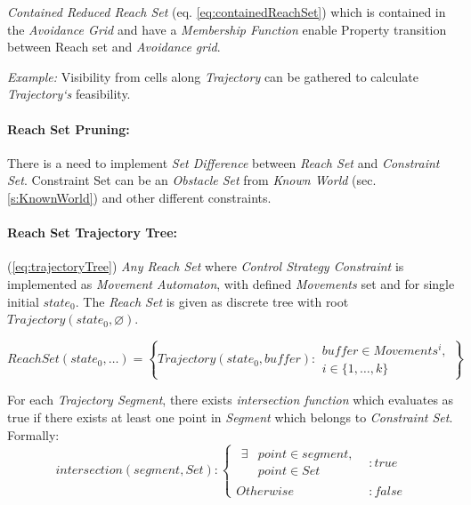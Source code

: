     \begin{note}
        \emph{Contained Reduced Reach Set} (eq. \ref{eq:containedReachSet}) which is contained in the \emph{Avoidance Grid} and have a \emph{Membership Function} enable Property transition between Reach set and \emph{Avoidance grid}. 
        
        \emph{Example:} Visibility from cells along \emph{Trajectory} can be gathered to calculate \emph{Trajectory`s} feasibility.
    \end{note}
    
    \paragraph{Reach Set Pruning:} There is a need to implement \emph{Set Difference} between \emph{Reach Set} and 
    \emph{Constraint Set}. Constraint Set can be an \emph{Obstacle Set} from \emph{Known World} (sec. \ref{s:KnownWorld}) and other different constraints.
    
    \paragraph{Reach Set Trajectory Tree:} (\ref{eq:trajectoryTree}) \emph{Any Reach Set} where \emph{Control Strategy Constraint} is implemented as \emph{Movement Automaton}, with defined \emph{Movements} set and for single initial $state_0$. The \emph{Reach Set} is given as discrete tree with root $Trajectory(state_0,\varnothing)$. 
    
    \begin{equation}\label{eq:trajectoryTree}
        ReachSet(state_0,\dots) = \left\{Trajectory(state_0,buffer):
        \begin{gathered}
            buffer\in Movements^i,\\
            i\in\{1,\dots,k\}
        \end{gathered}\right\}
    \end{equation}
    
    \noindent For each \emph{Trajectory Segment}, there exists \emph{intersection function} which evaluates as true if there exists at least one point in \emph{Segment} which belongs to \emph{Constraint Set}. Formally: 
    \begin{equation}\label{eq:reachsetIntersectionConstraintSet}
        intersection(segment,Set):
        \begin{cases}
            \begin{aligned}\exists &point \in segment,\\ &point \in Set \end{aligned}&: true \\
            Otherwise &: false 
        \end{cases}
    \end{equation}
    
